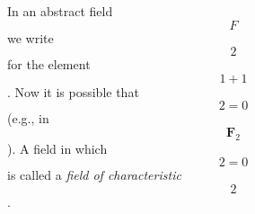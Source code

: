 In an abstract field $$F$$ we write $$2$$ for the element $$1 + 1$$. Now it is possible that $$2 = 0$$ (e.g., in $$\mathbf{F}_2$$). A field in which $$2 = 0$$ is called a \textit{field of characteristic} $$2$$.
